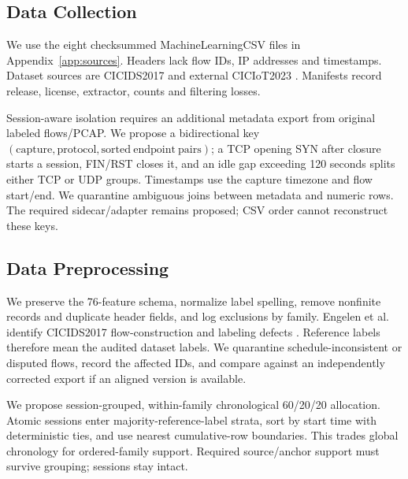 \documentclass[10pt,a4paper]{article}
\begin{document}
\subsection{Data Collection}
We use the eight checksummed MachineLearningCSV files in Appendix~\ref{app:sources}. Headers lack flow IDs, IP addresses and timestamps. Dataset sources are CICIDS2017 \cite{dataset} and external CICIoT2023 \cite{iot}. Manifests record release, license, extractor, counts and filtering losses.

Session-aware isolation requires an additional metadata export from original labeled flows/PCAP. We propose a bidirectional key $(\mathrm{capture},\mathrm{protocol},\mathrm{sorted\ endpoint\ pairs})$; a TCP opening SYN after closure starts a session, FIN/RST closes it, and an idle gap exceeding 120 seconds splits either TCP or UDP groups. Timestamps use the capture timezone and flow start/end. We quarantine ambiguous joins between metadata and numeric rows. The required sidecar/adapter remains proposed; CSV order cannot reconstruct these keys.

\subsection{Data Preprocessing}
We preserve the 76-feature schema, normalize label spelling, remove nonfinite records and duplicate header fields, and log exclusions by family. Engelen et al. identify CICIDS2017 flow-construction and labeling defects \cite{engelen}. Reference labels therefore mean the audited dataset labels. We quarantine schedule-inconsistent or disputed flows, record the affected IDs, and compare against an independently corrected export if an aligned version is available.

We propose session-grouped, within-family chronological 60/20/20 allocation. Atomic sessions enter majority-reference-label strata, sort by start time with deterministic ties, and use nearest cumulative-row boundaries. This trades global chronology for ordered-family support. Required source/anchor support must survive grouping; sessions stay intact.
\end{document}
